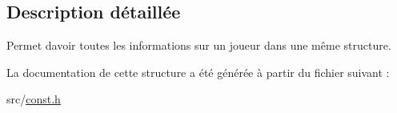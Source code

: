 

\subsection{Description détaillée}
Permet d\textquotesingle{}avoir toutes les informations sur un joueur dans une même structure. 

La documentation de cette structure a été générée à partir du fichier suivant \+:\begin{DoxyCompactItemize}
\item 
src/\hyperlink{const_8h}{const.\+h}\end{DoxyCompactItemize}
